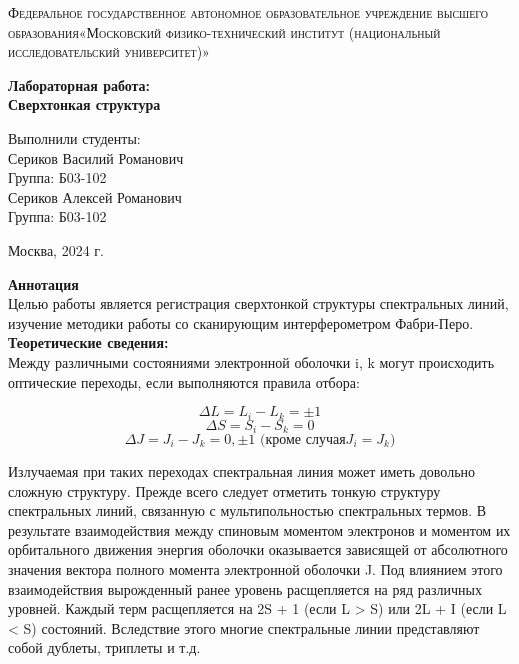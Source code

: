 \documentclass[a4paper, 12pt]{article}%
\begin{document}
	\begin{titlepage}
		\begin{center}
			\textsc{Федеральное государственное автономное образовательное учреждение высшего образования«Московский физико-технический институт (национальный исследовательский университет)»\\[5mm]
			}
			
			\vfill
			
			\textbf{Лабораторная работа: \\[3mm]
				Сверхтонкая структура
				\\[50mm]
			}
			
		\end{center}
		
		\hfill
		\begin{minipage}{.5\textwidth}
			Выполнили студенты:\\[2mm]
			Сериков Василий Романович\\[2mm]
			Группа: Б03-102\\[5mm]
			Сериков Алексей Романович\\[2mm]
			Группа: Б03-102\\[5mm]
			
		\end{minipage}
		\vfill
		\begin{center}
			Москва, 2024 г.
		\end{center}
		
	\end{titlepage}
	
	\newpage
	\textbf{Аннотация}\\
	
	Целью работы является регистрация сверхтонкой структуры спектральных линий, изучение методики работы со сканирующим интерферометром Фабри-Перо.\\
	
	\textbf{Теоретические сведения: }\\
	
	Между различными состояниями электронной оболочки i, k могут происходить оптические переходы, если выполняются правила отбора:
	
	$$ \Delta L = L_i - L_k = \pm 1 $$
	$$ \Delta S = S_i - S_k = 0 $$
	$$ \Delta J = J_i - J_k = 0, \pm 1 \text{    (кроме случая} J_i = J_k) $$
	
	Излучаемая при таких переходах спектральная линия может иметь довольно сложную структуру. Прежде всего следует отметить тонкую структуру спектральных линий, связанную с мультипольностью спектральных термов. В результате взаимодействия между спиновым моментом электронов и моментом их орбитального движения энергия оболочки оказывается зависящей от абсолютного значения вектора полного момента электронной оболочки J. Под влиянием этого взаимодействия вырожденный ранее уровень расщепляется на ряд различных уровней. Каждый терм расщепляется на 2S + 1 (если L > S) или 2L + I (если L < S) состояний. Вследствие этого многие спектральные линии представляют собой дублеты, триплеты и т.д.
	
\end{document}
